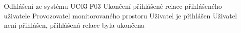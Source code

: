 
\begin{UseCaseTable}
  {Odhlášení ze systému}
  {UC03}
  {F03}
  {Ukončení přihlášené relace přihlášeného uživatele}
  {Provozovatel monitorovaného prostoru}
  {}
  {Uživatel je přihlášen}
  {Uživatel není přihlášen, přihlášená relace byla ukončena}


\end{UseCaseTable}
